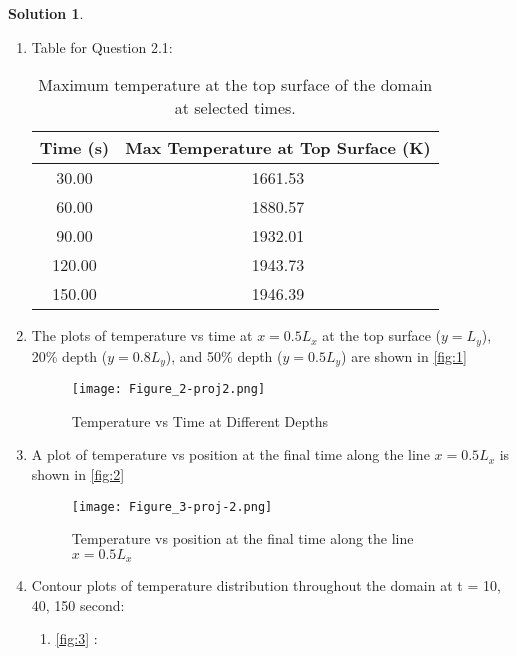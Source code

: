 \documentclass[12pt]{article}
\theoremstyle{definition} %
\newtheorem{solution}{Solution}
\theoremstyle{plain} %
\begin{document}
\begin{solution}
\begin{enumerate}
        \item Table for Question 2.1: \begin{table}[h!]
            \centering
            \begin{tabular}{|c|c|}
                \hline
                Time (s) & Max Temperature at Top Surface (K) \\ \hline
                30.00 & 1661.53 \\ \hline
                60.00 & 1880.57 \\ \hline
                90.00 & 1932.01 \\ \hline
                120.00 & 1943.73 \\ \hline
                150.00 & 1946.39 \\ \hline
            \end{tabular}
            \caption{Maximum temperature at the top surface of the domain at selected times.}
            \label{tab:maxtemp}
        \end{table}
    \item The plots of temperature vs time at $x = 0.5L_x$ at the top surface ($y = L_y$), 20\% depth ($y = 0.8L_y$), and 50\% depth ($y = 0.5L_y$) are shown in \autoref{fig:1}
     \begin{figure}[htbp]
        \centering
        \texttt{[image: Figure\_2-proj2.png]}
        \caption{Temperature vs Time at Different Depths}
        \label{fig:1}
    \end{figure}
    \item A plot of temperature vs position at the final time along the line $x = 0.5L_x$ is shown in \autoref{fig:2}
     \begin{figure}[htbp]
        \centering
        \texttt{[image: Figure\_3-proj-2.png]}
        \caption{Temperature vs position at the final time along the line $x = 0.5L_x$}
        \label{fig:2}
    \end{figure}
    \item Contour plots of temperature distribution throughout the domain at t = 10, 40, 150
    second:
    \begin{enumerate}
        \item \autoref{fig:3} : \begin{figure}[htbp]


\end{figure}
\end{enumerate}
\end{enumerate}
\end{solution}
\end{document}
